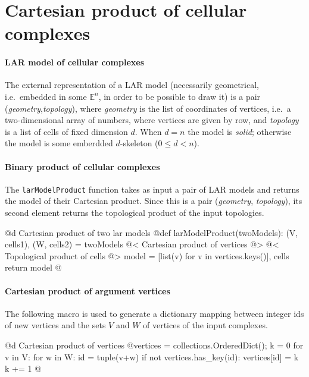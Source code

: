 \documentclass[11pt,oneside]{article}	%
\def\E{\mathbb{E}}
\begin{document}
\section{Cartesian product of cellular complexes}
\label{sec:product}

\paragraph{LAR model of cellular complexes}

The external representation of a LAR model (necessarily geometrical, i.e.~embedded in some $\E^n$, in order to be possible to draw it) is a pair (\emph{geometry},\emph{topology}), where \emph{geometry} is the list of coordinates of vertices, i.e.~a two-dimensional array of numbers, where vertices are given by row, and \emph{topology} is a list of cells of fixed dimension $d$. When $d=n$ the model is \emph{solid}; otherwise  the model is some emberdded $d$-skeleton ($0\leq d <n$).

\paragraph{Binary product of cellular complexes}
The \texttt{larModelProduct} function takes as input a pair of LAR models and returns the model of their Cartesian product. Since this is a pair (\emph{geometry}, \emph{topology}), its second element returns the topological product of the input topologies.

@d Cartesian product of two lar models  
@{def larModelProduct(twoModels):
    (V, cells1), (W, cells2) = twoModels
    @< Cartesian product of vertices @>
    @< Topological product of cells    @>
    model = [list(v) for v in vertices.keys()], cells
    return model
@}

\paragraph{Cartesian product of argument vertices}
The following macro is used to generate a dictionary mapping between integer ids of new vertices and the sets $V$ and $W$ of vertices of the input complexes.

@d Cartesian product of vertices  
@{vertices = collections.OrderedDict(); k = 0
for v in V:
    for w in W:
        id = tuple(v+w)
        if not vertices.has_key(id):
            vertices[id] = k
            k += 1	@}
\end{document}
